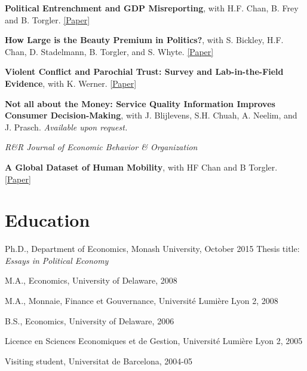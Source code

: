 \documentclass[letterpaper]{article}
\renewenvironment{itemize}{
  \begin{list}{}{
    \setlength{\leftmargin}{1.5em}
  }
}{
  \end{list}
}
\begin{document}
\begin{itemize}
	
	
	\item {\bf Political Entrenchment and GDP Misreporting}, with H.F. Chan, B. Frey and B. Torgler. 
 \href{https://www.cesifo.org/DocDL/cesifo1_wp7653.pdf}{[Paper]}
	

		\medskip
		

	\item \textbf{How Large is the Beauty Premium in Politics?}, with S. Bickley, H.F. Chan, D. Stadelmann, B. Torgler, and S. Whyte.  \href{https://papers.ssrn.com/sol3/papers.cfm?abstract_id=4273311}{[Paper]}
 
				\medskip
	\item \textbf{Violent Conflict and Parochial Trust: Survey and Lab-in-the-Field Evidence}, with K. Werner. \href{https://papers.ssrn.com/sol3/papers.cfm?abstract_id=4294035}{[Paper]}
	
\medskip
	
\item \textbf{Not all about the Money: Service Quality Information Improves Consumer Decision-Making}, with J. Blijlevens, S.H. Chuah, A. Neelim, and J. Prasch. \textit{Available upon request.}

\begin{itemize}
\item \textit{R\&R Journal of Economic Behavior \& Organization}
\end{itemize}
	
	\medskip
\item \textbf{A Global Dataset of Human Mobility}, with HF Chan and B Torgler. \href{https://drive.google.com/file/d/1\_0UwLGb5UwmHztSybZu\_1er8125UCmy0/view}{[Paper]}	


 
\end{itemize}



\section*{Education}

\begin{itemize}
	\item Ph.D., Department of Economics, Monash University, October 2015
	\subitem Thesis title: {\emph{Essays in Political Economy}}
	\item M.A., Economics, University of Delaware, 2008 
	\item M.A., Monnaie, Finance et Gouvernance, Universit\'e Lumi\`ere Lyon 2, 2008
	\item B.S., Economics, University of Delaware, 2006
	\item Licence en Sciences Economiques et de Gestion, Universit\'e Lumi\`ere Lyon 2, 2005
	\item Visiting student, Universitat de Barcelona, 2004-05
\end{itemize}
\end{document}
